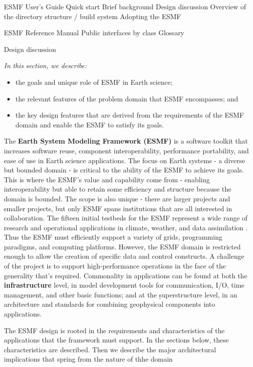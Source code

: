 
ESMF User's Guide
Quick start
Brief background
Design discussion
Overview of the directory structure / build system
Adopting the ESMF

ESMF Reference Manual
Public interfaces by class
Glossary

Design discussion

{\it 
In this section, we describe: 
\begin{itemize}
\item the goals and unique role of ESMF in Earth science;
\item the relevant features of the problem domain that ESMF encompasses; and
\item the key design features that are derived from the requirements of the ESMF domain and enable the ESMF to satisfy its goals. 
\end{itemize}
}

The {\bf Earth System Modeling Framework (ESMF)} is a software toolkit that increases software reuse, component interoperability, performance portability, and ease of use in Earth science applications.  The focus on Earth systems - a diverse but bounded domain - is critical to the ability of the ESMF to achieve its goals.  This is where the ESMF's value and capability come from - enabling interoperability but able to retain some efficiency and structure because the domain is bounded.  The scope is also unique - there are larger projects and smaller projects, but only ESMF spans institutions that are all interested in collaboration. The fifteen initial testbeds for the ESMF represent a wide range of research and operational applications in climate, weather, and data assimilation \cite{ref:models}.  Thus the ESMF must efficiently support a variety of grids, programming paradigms, and computing platforms.  However, the ESMF domain is restricted enough to allow the creation of specific data and control constructs.  A challenge of the project is to support high-performance operations in the face of the generality that's required.  Commonality in applications can be found at both the {\bf infrastructure} level, in model development tools for communication, I/O, time management, and other basic functions; and at the {\b superstructure} level, in an architecture and standards for combining geophysical components into applications.

The ESMF design is rooted in the requirements and characteristics of the applications that the framework must support.  In the sections below, these characteristics are described.  Then we describe the major architectural implications that spring from the nature of thhe domain

